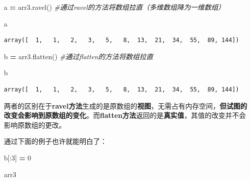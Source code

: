 \documentclass[]{article}
\newenvironment{Shaded}{\begin{snugshade}}{\end{snugshade}}
\newcommand{\DecValTok}[1]{\textcolor[rgb]{0.00,0.00,0.81}{#1}}
\newcommand{\CommentTok}[1]{\textcolor[rgb]{0.56,0.35,0.01}{\textit{#1}}}
\newcommand{\OperatorTok}[1]{\textcolor[rgb]{0.81,0.36,0.00}{\textbf{#1}}}
\newcommand{\NormalTok}[1]{#1}
\begin{document}
\begin{Shaded}
\begin{Highlighting}[]
\NormalTok{a }\OperatorTok{=}\NormalTok{ arr3.ravel()    }\CommentTok{#通过ravel的方法将数组拉直（多维数组降为一维数组）}
\end{Highlighting}
\end{Shaded}

\begin{Shaded}
\begin{Highlighting}[]
\NormalTok{a}
\end{Highlighting}
\end{Shaded}

\begin{verbatim}
array([  1,   1,   2,   3,   5,   8,  13,  21,  34,  55,  89, 144])
\end{verbatim}

\begin{Shaded}
\begin{Highlighting}[]
\NormalTok{b }\OperatorTok{=}\NormalTok{ arr3.flatten()  }\CommentTok{#通过flatten的方法将数组拉直}
\end{Highlighting}
\end{Shaded}

\begin{Shaded}
\begin{Highlighting}[]
\NormalTok{b}
\end{Highlighting}
\end{Shaded}

\begin{verbatim}
array([  1,   1,   2,   3,   5,   8,  13,  21,  34,  55,  89, 144])
\end{verbatim}

两者的区别在于\textbf{ravel方法}生成的是原数组的\textbf{视图}，无需占有内存空间，\textbf{但试图的改变会影响到原数组的变化}。而\textbf{flatten方法}返回的是\textbf{真实值}，其值的改变并不会影响原数组的更改。

通过下面的例子也许就能明白了：

\begin{Shaded}
\begin{Highlighting}[]
\NormalTok{b[:}\DecValTok{3}\NormalTok{] }\OperatorTok{=} \DecValTok{0}
\end{Highlighting}
\end{Shaded}

\begin{Shaded}
\begin{Highlighting}[]
\NormalTok{arr3}
\end{Highlighting}
\end{Shaded}
\end{document}
